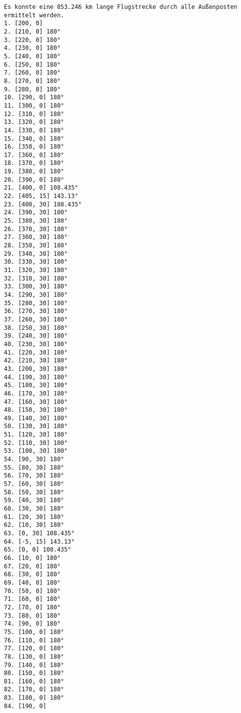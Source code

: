 \documentclass[a4paper,10pt,ngerman]{scrartcl}
\begin{document}
    \begin{lstlisting}[frame=single, title=Programmausgabe wenigerkrumm1.txt, breaklines=true,label={lst:lstlisting4}]
Es konnte eine 853.246 km lange Flugstrecke durch alle Außenposten ermittelt werden.
1. [200, 0]
2. [210, 0] 180°
3. [220, 0] 180°
4. [230, 0] 180°
5. [240, 0] 180°
6. [250, 0] 180°
7. [260, 0] 180°
8. [270, 0] 180°
9. [280, 0] 180°
10. [290, 0] 180°
11. [300, 0] 180°
12. [310, 0] 180°
13. [320, 0] 180°
14. [330, 0] 180°
15. [340, 0] 180°
16. [350, 0] 180°
17. [360, 0] 180°
18. [370, 0] 180°
19. [380, 0] 180°
20. [390, 0] 180°
21. [400, 0] 108.435°
22. [405, 15] 143.13°
23. [400, 30] 108.435°
24. [390, 30] 180°
25. [380, 30] 180°
26. [370, 30] 180°
27. [360, 30] 180°
28. [350, 30] 180°
29. [340, 30] 180°
30. [330, 30] 180°
31. [320, 30] 180°
32. [310, 30] 180°
33. [300, 30] 180°
34. [290, 30] 180°
35. [280, 30] 180°
36. [270, 30] 180°
37. [260, 30] 180°
38. [250, 30] 180°
39. [240, 30] 180°
40. [230, 30] 180°
41. [220, 30] 180°
42. [210, 30] 180°
43. [200, 30] 180°
44. [190, 30] 180°
45. [180, 30] 180°
46. [170, 30] 180°
47. [160, 30] 180°
48. [150, 30] 180°
49. [140, 30] 180°
50. [130, 30] 180°
51. [120, 30] 180°
52. [110, 30] 180°
53. [100, 30] 180°
54. [90, 30] 180°
55. [80, 30] 180°
56. [70, 30] 180°
57. [60, 30] 180°
58. [50, 30] 180°
59. [40, 30] 180°
60. [30, 30] 180°
61. [20, 30] 180°
62. [10, 30] 180°
63. [0, 30] 108.435°
64. [-5, 15] 143.13°
65. [0, 0] 108.435°
66. [10, 0] 180°
67. [20, 0] 180°
68. [30, 0] 180°
69. [40, 0] 180°
70. [50, 0] 180°
71. [60, 0] 180°
72. [70, 0] 180°
73. [80, 0] 180°
74. [90, 0] 180°
75. [100, 0] 180°
76. [110, 0] 180°
77. [120, 0] 180°
78. [130, 0] 180°
79. [140, 0] 180°
80. [150, 0] 180°
81. [160, 0] 180°
82. [170, 0] 180°
83. [180, 0] 180°
84. [190, 0]
    \end{lstlisting}
\end{document}
